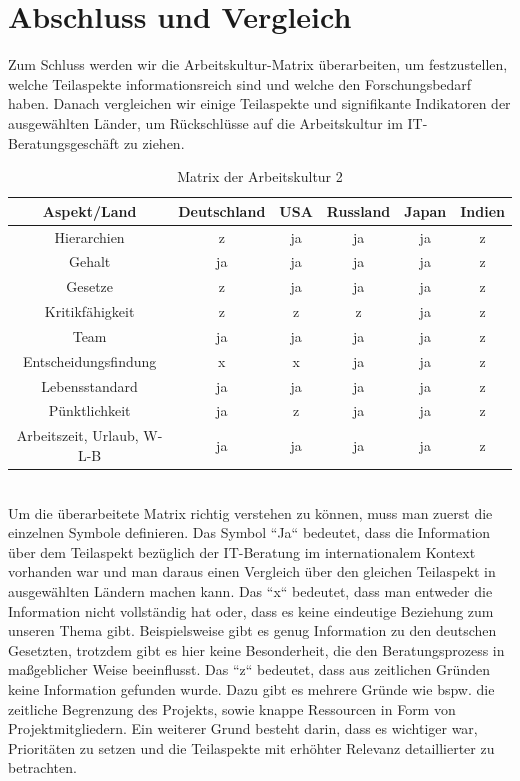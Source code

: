 \section{Abschluss und Vergleich}
Zum Schluss werden wir die Arbeitskultur-Matrix überarbeiten, um festzustellen, welche Teilaspekte informationsreich sind und welche den Forschungsbedarf haben. Danach vergleichen wir einige Teilaspekte und signifikante Indikatoren der ausgewählten Länder, um Rückschlüsse auf die Arbeitskultur im IT-Beratungsgeschäft zu ziehen.
\begin{table}[htp]
\begin{tabular}{|c|c|c|c|c|c|}
\hline  Aspekt/Land& Deutschland & USA & Russland & Japan & Indien \\ 
\hline 	Hierarchien  & z & ja & ja & ja &  z \\ 
\hline  Gehalt& ja & ja & ja & ja & z \\ 
\hline  Gesetze& z & ja & ja & ja & z  \\ 
\hline  Kritikfähigkeit& z & z & z & ja & z \\ 
\hline  Team& ja & ja & ja & ja & z\\ 
\hline  Entscheidungsfindung& x & x & ja & ja & z  \\ 
\hline  Lebensstandard& ja & ja & ja & ja & z \\ 
\hline  Pünktlichkeit& ja & z & ja & ja & z\\ 
\hline  Arbeitszeit, Urlaub, W-L-B& ja & ja & ja & ja & z\\ 
\hline 
\end{tabular} 
\caption{Matrix der Arbeitskultur 2}
\end{table}	\\
Um die überarbeitete Matrix richtig verstehen zu können, muss man zuerst die einzelnen Symbole definieren. Das Symbol ``Ja`` bedeutet, dass die Information über dem Teilaspekt bezüglich der IT-Beratung im internationalem Kontext vorhanden war und man daraus einen Vergleich über den gleichen Teilaspekt in ausgewählten Ländern machen kann. Das ``x`` bedeutet, dass man entweder die Information nicht vollständig hat oder, dass es keine eindeutige Beziehung zum unseren Thema gibt. Beispielsweise gibt es genug Information zu den deutschen Gesetzten, trotzdem gibt es hier keine Besonderheit, die den Beratungsprozess in maßgeblicher Weise beeinflusst. Das ``z`` bedeutet, dass aus zeitlichen Gründen keine Information gefunden wurde. Dazu gibt es mehrere Gründe wie bspw. die zeitliche Begrenzung des Projekts, sowie knappe Ressourcen in Form von Projektmitgliedern. Ein weiterer Grund besteht darin, dass es wichtiger war,  Prioritäten zu setzen und die Teilaspekte mit erhöhter Relevanz detaillierter zu betrachten.\\ \\
